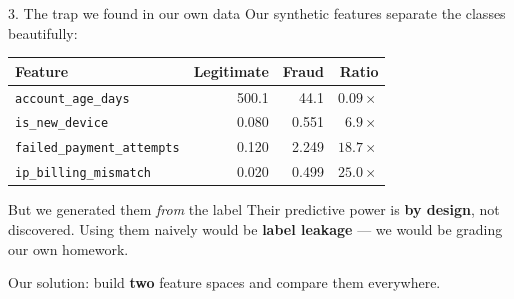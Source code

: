 \documentclass[aspectratio=169]{beamer}
\newcommand{\warn}[1]{\textcolor{hustdark}{\textbf{#1}}}
\begin{document}
\begin{frame}{3. The trap we found in our own data}
Our synthetic features separate the classes beautifully:

\begin{table}
\centering
\small
\begin{tabular}{lrrr}
\toprule
Feature & Legitimate & Fraud & Ratio \\
\midrule
\texttt{account\_age\_days}        & 500.1 & 44.1   & $0.09\times$ \\
\texttt{is\_new\_device}           & 0.080 & 0.551  & $6.9\times$ \\
\texttt{failed\_payment\_attempts} & 0.120 & 2.249  & $18.7\times$ \\
\texttt{ip\_billing\_mismatch}     & 0.020 & 0.499  & $25.0\times$ \\
\bottomrule
\end{tabular}
\end{table}

\begin{alertblock}{But we generated them \emph{from} the label}
Their predictive power is \warn{by design}, not discovered.
Using them naively would be \warn{label leakage} --- we would be grading
our own homework.
\end{alertblock}

\centering
\alert{Our solution: build \textbf{two} feature spaces and compare them everywhere.}
\end{frame}
\end{document}
